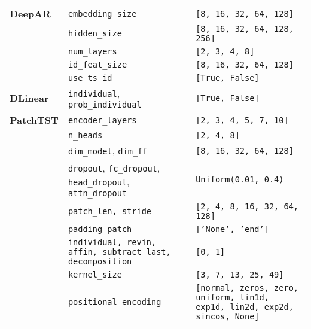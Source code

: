\documentclass[a4paper,oneside,bibliography=totoc]{scrbook}
\begin{document}
\begin{table}[htbp]
\begin{adjustbox}{center}
\begin{tabular}{lp{5cm}p{8cm}}
\textbf{DeepAR}
               & \texttt{embedding\_size} & \texttt{[8, 16,  32, 64, 128]} \\
               & \texttt{hidden\_size} & \texttt{[8, 16, 32, 64, 128, 256]} \\
               & \texttt{num\_layers} & \texttt{[2, 3, 4, 8]} \\
               & \texttt{id\_feat\_size} & \texttt{[8, 16, 32, 64, 128]} \\
               & \texttt{use\_ts\_id} & \texttt{[True, False]} \\
\hline
\textbf{DLinear}
                 & \texttt{individual}, \texttt{prob\_individual}  & \texttt{[True, False]} \\
\hline
\textbf{PatchTST}
& \texttt{encoder\_layers} & \texttt{[2, 3, 4, 5, 7, 10]} \\
                  & \texttt{n\_heads} & \texttt{[2, 4, 8]} \\
                  & \texttt{dim\_model}, \texttt{dim\_ff} & \texttt{[8, 16, 32, 64, 128]} \\
                  & \texttt{dropout}, \texttt{fc\_dropout}, \texttt{head\_dropout}, \texttt{attn\_dropout} & \texttt{Uniform(0.01, 0.4)} \\
                  & \texttt{patch\_len, stride} & \texttt{[2, 4, 8, 16, 32, 64, 128]} \\
                  & \texttt{padding\_patch} & \texttt{['None', 'end']} \\
                  & \texttt{individual, revin, affin, subtract\_last, decomposition} & \texttt{[0, 1]} \\
                  & \texttt{kernel\_size} & \texttt{[3, 7, 13, 25, 49]} \\
                  & \texttt{positional\_encoding} & \texttt{[normal, zeros, zero, uniform, lin1d, exp1d, lin2d, exp2d, sincos, None]} \\

\end{tabular}
\end{adjustbox}
\end{table}
\end{document}
